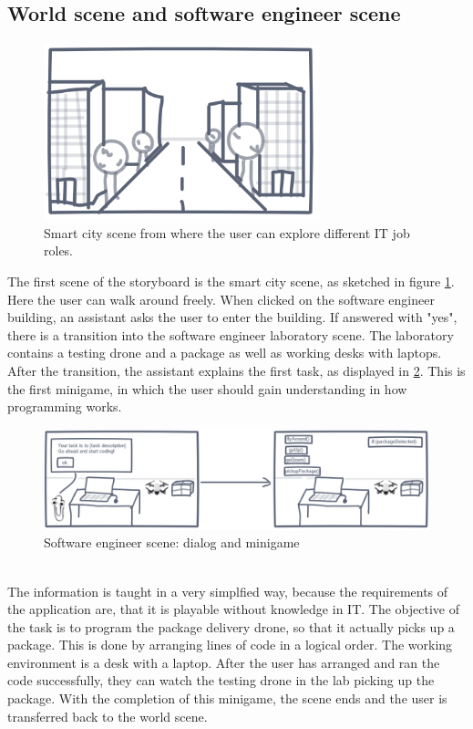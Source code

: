 \subsection{World scene and software engineer scene}
\begin{figure}[h!]
  \includegraphics[width=8cm]{kapitel/storyboard/smart-city.PNG}
  \centering
  \caption{Smart city scene from where the user can explore different IT job roles.}
  \label{fig:smartcity}
\end{figure}
The first scene of the storyboard is the smart city scene, as sketched in figure \ref{fig:smartcity}. Here the user can walk around freely. When clicked on the software engineer building, an assistant asks the user to enter the building. If answered with "yes", there is a transition into the software engineer laboratory scene. The laboratory contains a testing drone and a package as well as working desks with laptops. After the transition, the assistant explains the first task, as displayed in \ref{fig:sescene}. This is the first minigame, in which the user should gain understanding in how programming works.
\begin{figure}[h!]
  \includegraphics[width=16cm]{kapitel/storyboard/se-scene.PNG}
  \centering
  \caption{Software engineer scene: dialog and minigame}
  \label{fig:sescene}
\end{figure}
\\The information is taught in a very simplfied way, because the requirements of the application are, that it is playable without knowledge in IT. The objective of the task is to program the package delivery drone, so that it actually picks up a package. This is done by arranging lines of code in a logical order. The working environment is a desk with a laptop. After the user has arranged and ran the code successfully, they can watch the testing drone in the lab picking up the package. With the completion of this minigame, the scene ends and the user is transferred back to the world scene.
